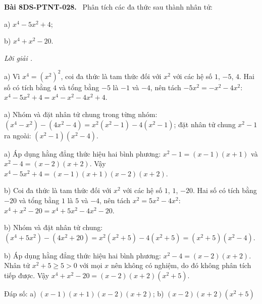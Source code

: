 \documentclass[12pt,a4paper]{article}
\newenvironment{problem}[1][]{\par\medskip\noindent\textbf{Bài #1.}\ }{\par}
\newenvironment{solution}[1][]{\par\noindent\textit{Lời giải #1.}\par}{\par}
\begin{document}
\begin{problem}[8DS-PTNT-028]
Phân tích các đa thức sau thành nhân tử:

a) $x^4 - 5x^2 + 4$;

b) $x^4 + x^2 - 20$.

\begin{solution}
a) Vì $x^4 = (x^2)^2$, coi đa thức là tam thức đối với $x^2$ với các hệ số $1$, $-5$, $4$. Hai số có tích bằng $4$ và tổng bằng $-5$ là $-1$ và $-4$, nên tách $-5x^2 = -x^2 - 4x^2$: $x^4 - 5x^2 + 4 = x^4 - x^2 - 4x^2 + 4$.

a) Nhóm và đặt nhân tử chung trong từng nhóm: $(x^4 - x^2) - (4x^2 - 4) = x^2(x^2 - 1) - 4(x^2 - 1)$; đặt nhân tử chung $x^2 - 1$ ra ngoài: $(x^2 - 1)(x^2 - 4)$.

a) Áp dụng hằng đẳng thức hiệu hai bình phương: $x^2 - 1 = (x - 1)(x + 1)$ và $x^2 - 4 = (x - 2)(x + 2)$. Vậy $x^4 - 5x^2 + 4 = (x - 1)(x + 1)(x - 2)(x + 2)$.

b) Coi đa thức là tam thức đối với $x^2$ với các hệ số $1$, $1$, $-20$. Hai số có tích bằng $-20$ và tổng bằng $1$ là $5$ và $-4$, nên tách $x^2 = 5x^2 - 4x^2$: $x^4 + x^2 - 20 = x^4 + 5x^2 - 4x^2 - 20$.

b) Nhóm và đặt nhân tử chung: $(x^4 + 5x^2) - (4x^2 + 20) = x^2(x^2 + 5) - 4(x^2 + 5) = (x^2 + 5)(x^2 - 4)$.

b) Áp dụng hằng đẳng thức hiệu hai bình phương: $x^2 - 4 = (x - 2)(x + 2)$. Nhân tử $x^2 + 5 \geq 5 > 0$ với mọi $x$ nên không có nghiệm, do đó không phân tích tiếp được. Vậy $x^4 + x^2 - 20 = (x - 2)(x + 2)(x^2 + 5)$.

Đáp số: a) $\boxed{(x - 1)(x + 1)(x - 2)(x + 2)}$; b) $\boxed{(x - 2)(x + 2)(x^2 + 5)}$
\end{solution}
\end{problem}
\end{document}

